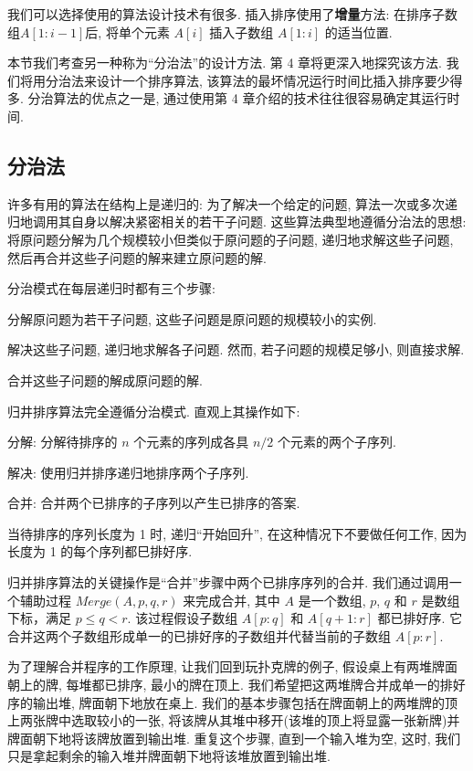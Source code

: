 \documentclass[oneside,10pt,fontset=none]{ctexbook}
\numberwithin{definition}{chapter}
\numberwithin{theorem}{chapter}
\numberwithin{lemma}{chapter}
\begin{document}
我们可以选择使用的算法设计技术有很多. 插入排序使用了\textbf{增量}方法: 在排序子数组$A[1:i-1]$后, 将单个元素 $A[i]$ 插入子数组 $A[1:i]$ 的适当位置.

本节我们考查另一种称为``分治法''的设计方法. 第 4 章将更深入地探究该方法. 我们将用分治法来设计一个排序算法, 该算法的最坏情况运行时间比插入排序要少得多. 分治算法的优点之一是, 通过使用第 4 章介绍的技术往往很容易确定其运行时间.

\subsection{分治法}

许多有用的算法在结构上是递归的: 为了解决一个给定的问题, 算法一次或多次递归地调用其自身以解决紧密相关的若干子问题. 这些算法典型地遵循分治法的思想: 将原问题分解为几个规模较小但类似于原问题的子问题, 递归地求解这些子问题, 然后再合并这些子问题的解来建立原问题的解.

分治模式在每层递归时都有三个步骤:

分解原问题为若干子问题, 这些子问题是原问题的规模较小的实例.

解决这些子问题, 递归地求解各子问题. 然而, 若子问题的规模足够小, 则直接求解.

合并这些子问题的解成原问题的解.

归井排序算法完全遵循分治模式. 直观上其操作如下:

分解: 分解待排序的 $n$ 个元素的序列成各具 $n/2$ 个元素的两个子序列.

解决: 使用归并排序递归地排序两个子序列.

合并: 合并两个已排序的子序列以产生已排序的答案.

当待排序的序列长度为 1 时, 递归``开始回升'', 在这种情况下不要做任何工作, 因为长度为 1 的每个序列都巳排好序.

归并排序算法的关键操作是``合并''步骤中两个已排序序列的合并. 我们通过调用一个辅助过程 $Merge(A, p, q, r)$ 来完成合并, 其中 $A$ 是一个数组, $p$, $q$ 和 $r$ 是数组下标，满足 $p\leq q<r$. 该过程假设子数组 $A[p:q]$ 和 $A[q+1:r]$ 都已排好序. 它合并这两个子数组形成单一的已排好序的子数组并代替当前的子数组 $A[p:r]$.

为了理解合并程序的工作原理, 让我们回到玩扑克牌的例子, 假设桌上有两堆牌面朝上的牌, 每堆都已排序, 最小的牌在顶上. 我们希望把这两堆牌合并成单一的排好序的输出堆, 牌面朝下地放在桌上. 我们的基本步骤包括在牌面朝上的两堆牌的顶上两张牌中选取较小的一张, 将该牌从其堆中移开(该堆的顶上将显露一张新牌)并牌面朝下地将该牌放置到输出堆. 重复这个步骤, 直到一个输入堆为空, 这时, 我们只是拿起剩余的输入堆并牌面朝下地将该堆放置到输出堆.
\end{document}
